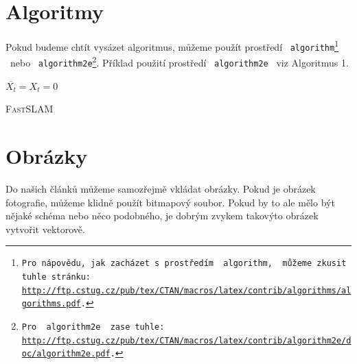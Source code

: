 \documentclass[a4paper, 11pt]{article}
\begin{document}
\medskip
\pagebreak

\section{Algoritmy}


Pokud budeme chtít vysázet algoritmus, můžeme použít prostředí \  \texttt{algorithm\footnote{Pro nápovědu, jak zacházet s prostředím \ \texttt{algorithm,} \ můžeme zkusit tuhle stránku:\\ \url{http://ftp.cstug.cz/pub/tex/CTAN/macros/latex/contrib/algorithms/algorithms.pdf}.}} \ nebo \ \texttt{algorithm2e\footnote{Pro \ \texttt{algorithm2e} \ zase tuhle:  \url{http://ftp.cstug.cz/pub/tex/CTAN/macros/latex/contrib/algorithm2e/doc/algorithm2e.pdf}.}}. Příklad použití prostředí \  \texttt{algorithm2e}  \ viz Algoritmus 1.

\vfill
{}
\IncMargin{1.5em}
\begin{algorithm}[H]
    \SetAlgoNoLine
    \SetNlSty{}{}{:}
    \label{algoritmus1}
    
    \Indm 
    \BlankLine
    
    \Indp
    $\overline{X_t} = X_t = 0$\\
    \caption{\textsc{FastSLAM}}
\end{algorithm}
\DecMargin{1.5em}
\vfill

\section{Obrázky}
Do našich článků můžeme samozřejmě vkládat obrázky. Pokud je obrázek fotografie, můžeme klidně použít bitmapový soubor. Pokud by to ale mělo být nějaké schéma nebo něco podobného, je dobrým zvykem takovýto obrázek vytvořit vektorově.
\end{document}
